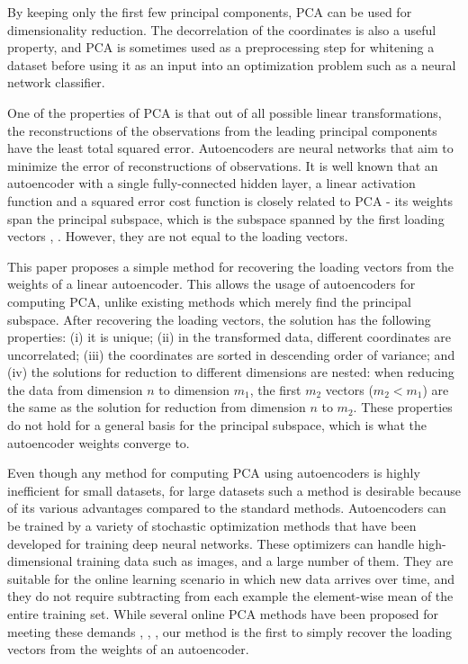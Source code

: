 \documentclass[journal]{IEEEtran}
\begin{document}
By keeping only the first few principal components, PCA can be used for dimensionality reduction. The decorrelation of the coordinates is also a useful property, and PCA is sometimes used as a preprocessing step for whitening a dataset before using it as an input into an optimization problem such as a neural network classifier.

One of the properties of PCA is that out of all possible linear transformations, the reconstructions of the observations from the leading principal components have the least total squared error. Autoencoders are neural networks that aim to minimize the error of reconstructions of observations. It is well known that an autoencoder with a single fully-connected hidden layer, a linear activation function and a squared error cost function is closely related to PCA - its weights span the principal subspace, which is the subspace spanned by the first loading vectors \cite{AutoencoderSVD}, \cite{WithoutLocalMinima}. However, they are not equal to the loading vectors.

This paper proposes a simple method for recovering the loading vectors from the weights of a linear autoencoder. This allows the usage of autoencoders for computing PCA, unlike existing methods which merely find the principal subspace. After recovering the loading vectors, the solution has the following properties: (i) it is unique; (ii) in the transformed data, different coordinates are uncorrelated; (iii) the coordinates are sorted in descending order of variance; and (iv) the solutions for reduction to different dimensions are nested: when reducing the data from dimension $n$ to dimension $m_1$, the first $m_2$ vectors ($m_2 < m_1$) are the same as the solution for reduction from dimension $n$ to $m_2$. These properties do not hold for a general basis for the principal subspace, which is what the autoencoder weights converge to.

Even though any method for computing PCA using autoencoders is highly inefficient for small datasets, for large datasets such a method is desirable because of its various advantages compared to the standard methods. Autoencoders can be trained by a variety of stochastic optimization methods that have been developed for training deep neural networks. These optimizers can handle high-dimensional training data such as images, and a large number of them. They are suitable for the online learning scenario in which new data arrives over time, and they do not require subtracting from each example the element-wise mean of the entire training set. While several online PCA methods have been proposed for meeting these demands \cite{Online1}, \cite{Online2}, \cite{Online3}, our method is the first to simply recover the loading vectors from the weights of an autoencoder.
\end{document}
